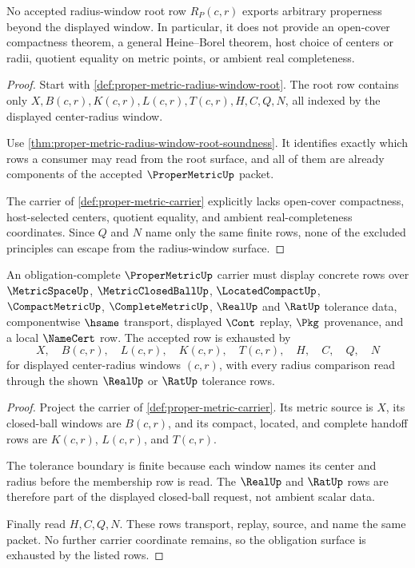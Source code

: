 \begin{theorem}
\label{thm:proper-metric-radius-window-nonescape}
No accepted radius-window root row $R_P(c,r)$ exports arbitrary properness beyond the displayed window. In particular, it does not provide an open-cover compactness theorem, a general Heine--Borel theorem, host choice of centers or radii, quotient equality on metric points, or ambient real completeness.
\end{theorem}
\begin{proof}
Start with \autoref{def:proper-metric-radius-window-root}. The root row contains only $X,B(c,r),K(c,r),L(c,r),T(c,r),H,C,Q,N$, all indexed by the displayed center-radius window.

Use \autoref{thm:proper-metric-radius-window-root-soundness}. It identifies exactly which rows a consumer may read from the root surface, and all of them are already components of the accepted $\ProperMetricUp$ packet.

The carrier of \autoref{def:proper-metric-carrier} explicitly lacks open-cover compactness, host-selected centers, quotient equality, and ambient real-completeness coordinates. Since $Q$ and $N$ name only the same finite rows, none of the excluded principles can escape from the radius-window surface.
\end{proof}

\begin{theorem}
\label{thm:propermetric-obligation-carrier}
An obligation-complete $\ProperMetricUp$ carrier must display concrete rows over $\MetricSpaceUp$, $\MetricClosedBallUp$, $\LocatedCompactUp$, $\CompactMetricUp$, $\CompleteMetricUp$, $\RealUp$ and $\RatUp$ tolerance data, componentwise $\hsame$ transport, displayed $\Cont$ replay, $\Pkg$ provenance, and a local $\NameCert$ row. The accepted row is exhausted by
$$
X,\quad B(c,r),\quad L(c,r),\quad K(c,r),\quad T(c,r),\quad H,\quad C,\quad Q,\quad N
$$
for displayed center-radius windows $(c,r)$, with every radius comparison read through the shown $\RealUp$ or $\RatUp$ tolerance rows.
\end{theorem}
\begin{proof}
Project the carrier of \autoref{def:proper-metric-carrier}. Its metric source is $X$, its closed-ball windows are $B(c,r)$, and its compact, located, and complete handoff rows are $K(c,r)$, $L(c,r)$, and $T(c,r)$.

The tolerance boundary is finite because each window names its center and radius before the membership row is read. The $\RealUp$ and $\RatUp$ rows are therefore part of the displayed closed-ball request, not ambient scalar data.

Finally read $H,C,Q,N$. These rows transport, replay, source, and name the same packet. No further carrier coordinate remains, so the obligation surface is exhausted by the listed rows.
\end{proof}


